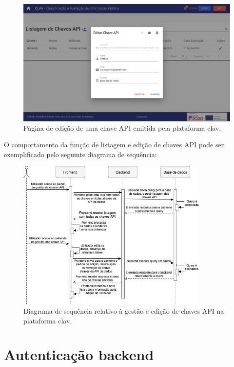 \begin{figure}[H]
    \centering
    \includegraphics[width=\textwidth]{img/clav/gestaoAPI/editarChave.png}
    \caption{Página de edição de uma chave API emitida pela plataforma \gls{clav}.}
    \label{fig:edicaoChavesAPI}
\end{figure}

\vspace{-3mm}
O comportamento da função de listagem e edição de chaves API pode ser exemplificado pelo seguinte diagrama de sequência:
\vspace{-1mm}
\begin{figure}[H]
    \centering
    \includegraphics[width=0.85\textwidth]{img/diagramas/sequencia/DiagramasSequencia-GestaoAPI.png}
    \caption{Diagrama de sequência relativo à gestão e edição de chaves API na plataforma \gls{clav}.}
    \label{fig:diagramaSequenciaGestaoAPI}
\end{figure}

\cleardoublepage
\section{Autenticação backend}

